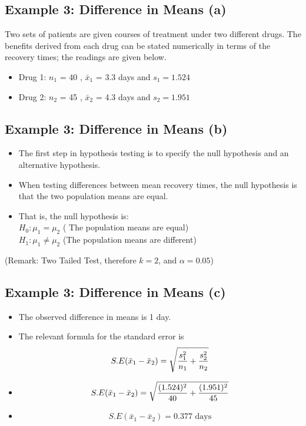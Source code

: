 \documentclass[a4paper,12pt]{article}
\begin{document}
\subsection*{Example 3: Difference in Means (a) }
Two sets of patients are given courses of treatment under two different drugs. The benefits
derived from each drug can be stated numerically in terms of the recovery times; the readings are given below.

\begin{itemize}
\item Drug 1:  $n_1$ = 40 , $\bar{x}_1$ = 3.3 days and $s_1 = 1.524$
\item Drug 2:  $n_2$ = 45 , $\bar{x}_2$ = 4.3 days and $s_2 = 1.951 $
\end{itemize}



\subsection*{Example 3: Difference in Means (b) }
\begin{itemize}
\item
The first step in hypothesis testing is to specify the null hypothesis and an alternative hypothesis.
\item When testing differences between mean recovery times, the null hypothesis is that the two population means are equal.
\item That is, the null hypothesis is:\\
$H_0: \mu_1 = \mu_2$ ( The population means are equal)\\
$H_1: \mu_1 \neq \mu_2$ (The population means are different)\\
\end{itemize}
(Remark: Two Tailed Test, therefore $k = 2$, and $\alpha = 0.05$)



\subsection*{Example 3: Difference in Means (c) }
\begin{itemize}
\item The observed difference in means is 1 day.
\item The relevant formula for the standard error is
\[ S.E(\bar{x}_1 - \bar{x}_2) = \sqrt{{s^2_1\over n_1}+{s^2_2 \over n_2}} \]
\item  \[ S.E(\bar{x}_1 - \bar{x}_2) = \sqrt{{(1.524)^2 \over 40}+{(1.951)^2 \over 45}}   \]
\item  \[ S.E(\bar{x}_1 - \bar{x}_2) = 0.377\mbox{ days}\]
\end{itemize}
\end{document}
